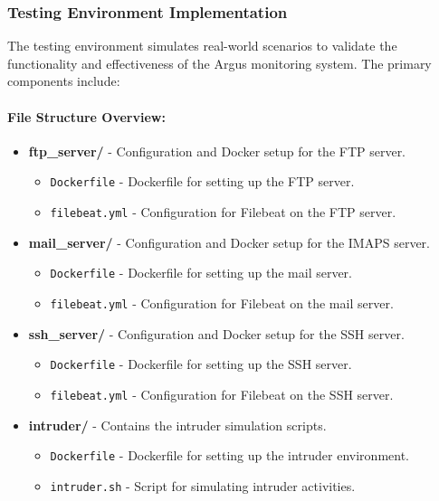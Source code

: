 \documentclass{article}
\begin{document}
    \subsubsection{Testing Environment Implementation}\label{subsubsec:testing-environment-implementation}

    The testing environment simulates real-world scenarios to validate the functionality and effectiveness of the Argus monitoring system.
    The primary components include:

    \paragraph{File Structure Overview:}
    \begin{itemize}
        \item \textbf{ftp\_server/} - Configuration and Docker setup for the FTP server.
        \begin{itemize}
            \item \texttt{Dockerfile} - Dockerfile for setting up the FTP server.
            \item \texttt{filebeat.yml} - Configuration for Filebeat on the FTP server.
        \end{itemize}
        \item \textbf{mail\_server/} - Configuration and Docker setup for the IMAPS server.
        \begin{itemize}
            \item \texttt{Dockerfile} - Dockerfile for setting up the mail server.
            \item \texttt{filebeat.yml} - Configuration for Filebeat on the mail server.
        \end{itemize}
        \item \textbf{ssh\_server/} - Configuration and Docker setup for the SSH server.
        \begin{itemize}
            \item \texttt{Dockerfile} - Dockerfile for setting up the SSH server.
            \item \texttt{filebeat.yml} - Configuration for Filebeat on the SSH server.
        \end{itemize}
        \item \textbf{intruder/} - Contains the intruder simulation scripts.
        \begin{itemize}
            \item \texttt{Dockerfile} - Dockerfile for setting up the intruder environment.
            \item \texttt{intruder.sh} - Script for simulating intruder activities.
        \end{itemize}
    \end{itemize}
\end{document}
